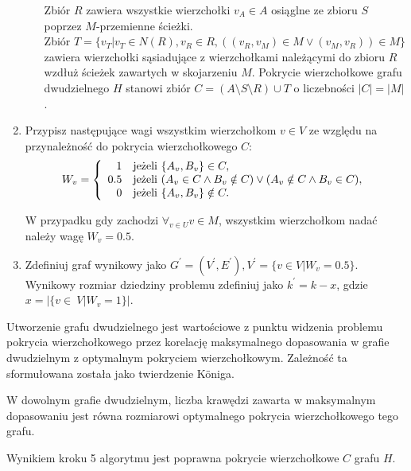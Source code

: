 \begin{enumerate}
\begin{itemize}
        Zbiór $R$ zawiera wszystkie wierzchołki $v_A \in A$ osiąglne ze zbioru $S$ poprzez $M$-przemienne ścieżki. \\
        Zbiór $T=\{v_T|v_T \in N(R), v_R \in R, ((v_R,v_M) \in M \lor (v_M,v_R)) \in M\}$ zawiera wierzchołki sąsiadujące z wierzchołkami należącymi do zbioru $R$ wzdłuż ścieżek zawartych w skojarzeniu $M$.
        Pokrycie wierzchołkowe grafu dwudzielnego $H$ stanowi zbiór $C=(A \setminus S \setminus R) \cup T$ o liczebności $|C|=|M|$.
    \end{itemize}
  \item Przypisz następujące wagi wszystkim wierzchołkom $v \in V$ ze względu na przynależność do pokrycia wierzchołkowego $C$:
    \begin{equation*}
    W_v = \left\{
    \begin{array}{rl}
    1 & \textnormal{jeżeli } \{A_v, B_v\} \in C,\\
    0.5 & \textnormal{jeżeli } (A_v \in C \land B_v \notin C) \lor (A_v \notin C \land B_v \in C),\\
    0 & \textnormal{jeżeli } \{A_v, B_v\} \notin C.
    \end{array} \right.
    \end{equation*}

    W przypadku gdy zachodzi $\forall_{v \in U}{v \in M}$, wszystkim wierzchołkom nadać należy wagę $W_v=0.5$.
  \item Zdefiniuj graf wynikowy jako 
    $G^\prime=(V^\prime, E^\prime), V^\prime=\{v \in V|W_v=0.5\}$.
    Wynikowy rozmiar dziedziny problemu zdefiniuj jako 
    $k^\prime=k-x$, gdzie $x=|\{v\in~V|W_v=1\}|$.
\end{enumerate}
Utworzenie grafu dwudzielnego jest wartościowe z punktu widzenia problemu
pokrycia wierzchołkowego przez korelację maksymalnego dopasowania w grafie
dwudzielnym z optymalnym pokryciem wierzchołkowym. 
Zależność ta sformułowana została jako twierdzenie K\"oniga.
\begin{theorem}
  W dowolnym grafie dwudzielnym, liczba krawędzi zawarta w maksymalnym
  dopasowaniu jest równa rozmiarowi optymalnego pokrycia wierzchołkowego tego
  grafu.
\end{theorem}
\begin{theorem}\label{theorem_nf1}
  Wynikiem kroku 5 algorytmu jest poprawna pokrycie wierzchołkowe $C$ grafu $H$.
\end{theorem}

